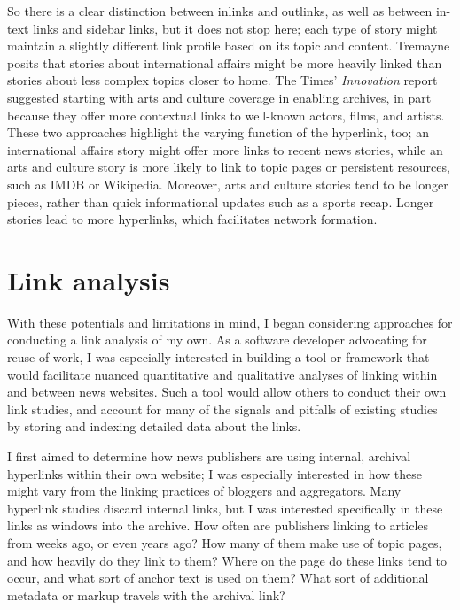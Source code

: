 So there is a clear distinction between inlinks and outlinks, as well as between in-text links and sidebar links, but it does not stop here; each type of story might maintain a slightly different link profile based on its topic and content. Tremayne posits that stories about international affairs might be more heavily linked than stories about less complex topics closer to home.\autocite{tremayne_web_2004} The Times' \emph{Innovation} report suggested starting with arts and culture coverage in enabling archives, in part because they offer more contextual links to well-known actors, films, and artists.\autocite{_innovation_2014} These two approaches highlight the varying function of the hyperlink, too; an international affairs story might offer more links to recent news stories, while an arts and culture story is more likely to link to topic pages or persistent resources, such as IMDB or Wikipedia. Moreover, arts and culture stories tend to be longer pieces, rather than quick informational updates such as a sports recap. Longer stories lead to more hyperlinks, which facilitates network formation.

\section{Link analysis}

With these potentials and limitations in mind, I began considering approaches for conducting a link analysis of my own. As a software developer advocating for reuse of work, I was especially interested in building a tool or framework that would facilitate nuanced quantitative and qualitative analyses of linking within and between news websites. Such a tool would allow others to conduct their own link studies, and account for many of the signals and pitfalls of existing studies by storing and indexing detailed data about the links.


I first aimed to determine how news publishers are using internal, archival hyperlinks within their own website; I was especially interested in how these might vary from the linking practices of bloggers and aggregators. Many hyperlink studies discard internal links, but I was interested specifically in these links as windows into the archive. How often are publishers linking to articles from weeks ago, or even years ago? How many of them make use of topic pages, and how heavily do they link to them? Where on the page do these links tend to occur, and what sort of anchor text is used on them? What sort of additional metadata or markup travels with the archival link?

